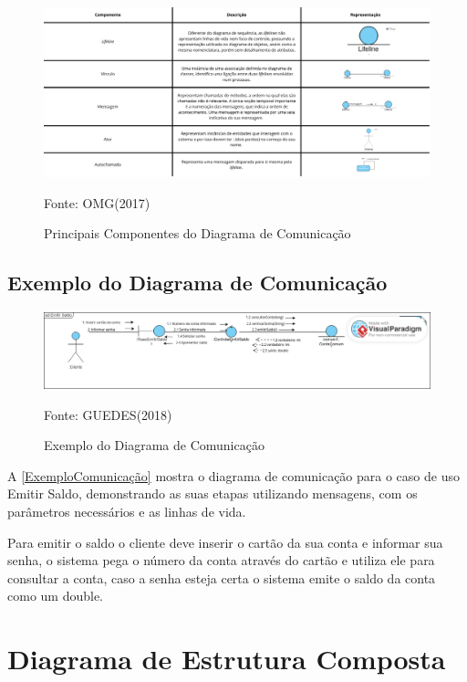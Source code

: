 \documentclass[12pt,openright,oneside,a4paper,
	chapter=TITLE,
	section=TITLE,
	english,brazil]{abntex2}
\begin{document}
\begin{figure}[!htp]
	\caption{Principais Componentes do Diagrama de Comunicação}
	\centering
	\includegraphics[scale=0.2]{img/Componentes Principais do Diagrama de Comunicação.png}
	\\

	\footnotesize\raggedright Fonte: OMG(2017)
\end{figure}

\section{Exemplo do Diagrama de Comunicação}

\begin{figure}[!htp]
	\caption{Exemplo do Diagrama de Comunicação}
	\centering
	\includegraphics[scale=0.3]{img/Exemplo Diagrama de Comunicação.png}
	\\

	\label{ExemploComunicação}
	\footnotesize\raggedright Fonte: GUEDES(2018)
\end{figure}

A \autoref{ExemploComunicação} mostra o diagrama de comunicação para o caso de uso Emitir Saldo, demonstrando as suas etapas utilizando mensagens, com os parâmetros necessários e as linhas de vida.

Para emitir o saldo o cliente deve inserir o cartão da sua conta e informar sua senha, o sistema pega o número da conta através do cartão e utiliza ele para consultar a conta, caso a senha esteja certa o sistema emite o saldo da conta como um double.

\chapter{Diagrama de Estrutura Composta}
\end{document}
